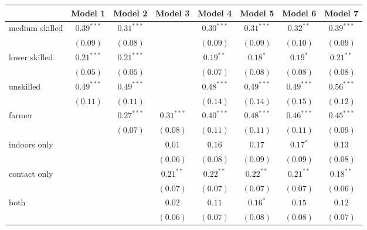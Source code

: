 
\begin{table}
\begin{center}
\begin{tabular}{l c c c c c c c}
\hline
 & Model 1 & Model 2 & Model 3 & Model 4 & Model 5 & Model 6 & Model 7 \\
\hline
medium skilled & $0.39^{***}$ & $0.31^{***}$ &              & $0.30^{***}$ & $0.31^{***}$  & $0.32^{**}$   & $0.39^{***}$  \\
               & $(0.09)$     & $(0.08)$     &              & $(0.09)$     & $(0.09)$      & $(0.10)$      & $(0.09)$      \\
lower skilled  & $0.21^{***}$ & $0.21^{***}$ &              & $0.19^{**}$  & $0.18^{*}$    & $0.19^{*}$    & $0.21^{**}$   \\
               & $(0.05)$     & $(0.05)$     &              & $(0.07)$     & $(0.08)$      & $(0.08)$      & $(0.08)$      \\
unskilled      & $0.49^{***}$ & $0.49^{***}$ &              & $0.48^{***}$ & $0.49^{***}$  & $0.49^{***}$  & $0.56^{***}$  \\
               & $(0.11)$     & $(0.11)$     &              & $(0.14)$     & $(0.14)$      & $(0.15)$      & $(0.12)$      \\
farmer         &              & $0.27^{***}$ & $0.31^{***}$ & $0.40^{***}$ & $0.48^{***}$  & $0.46^{***}$  & $0.45^{***}$  \\
               &              & $(0.07)$     & $(0.08)$     & $(0.11)$     & $(0.11)$      & $(0.11)$      & $(0.09)$      \\
indoors only   &              &              & $0.01$       & $0.16$       & $0.17$        & $0.17^{*}$    & $0.13$        \\
               &              &              & $(0.06)$     & $(0.08)$     & $(0.09)$      & $(0.09)$      & $(0.08)$      \\
contact only   &              &              & $0.21^{**}$  & $0.22^{**}$  & $0.22^{**}$   & $0.21^{**}$   & $0.18^{**}$   \\
               &              &              & $(0.07)$     & $(0.07)$     & $(0.07)$      & $(0.07)$      & $(0.06)$      \\
both           &              &              & $0.02$       & $0.11$       & $0.16^{*}$    & $0.15$        & $0.12$        \\
               &              &              & $(0.06)$     & $(0.07)$     & $(0.08)$      & $(0.08)$      & $(0.07)$      \\

\end{tabular}
\end{center}
\end{table}
